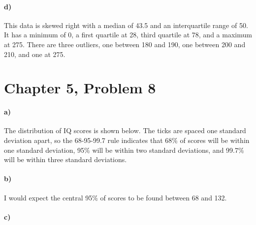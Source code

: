 \documentclass[12pt]{article}
\begin{document}
\paragraph{d)}

This data is skewed right with a median of 43.5 and an interquartile range of 50. It has a minimum of
0, a first quartile at 28, third quartile at 78, and a maximum at 275. There are three outliers, one
between 180 and 190, one between 200 and 210, and one at 275.

\pagebreak

\section*{Chapter 5, Problem 8}

\paragraph{a)}

The distribution of IQ scores is shown below. The ticks are spaced one standard deviation apart,
so the 68-95-99.7 rule indicates that 68\% of scores will be within one standard deviation,
95\% will be within two standard deviations, and 99.7\% will be within three standard deviations.

\begin{center}
\end{center}

\paragraph{b)}

I would expect the central 95\% of scores to be found between 68 and 132.

\paragraph{c)}
\end{document}
